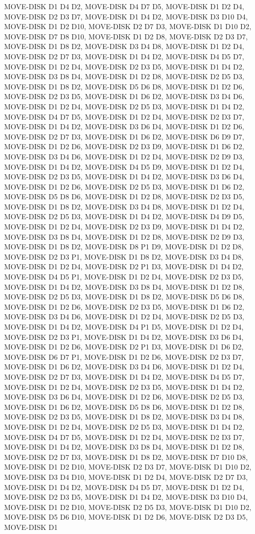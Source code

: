 \documentclass[12pt]{article}
\begin{document}
\begin{appendix}
\begin{itemize}
MOVE-DISK D1 D4 D2,  MOVE-DISK D4 D7 D5,  MOVE-DISK D1 D2 D4,  MOVE-DISK D2 D3 D7,  MOVE-DISK D1 D4 D2,  MOVE-DISK D3 D10 D4,  MOVE-DISK D1 D2 D10,  MOVE-DISK D2 D7 D3,  MOVE-DISK D1 D10 D2,  MOVE-DISK D7 D8 D10,  MOVE-DISK D1 D2 D8,  MOVE-DISK D2 D3 D7,  MOVE-DISK D1 D8 D2,  MOVE-DISK D3 D4 D8,  MOVE-DISK D1 D2 D4,  MOVE-DISK D2 D7 D3,  MOVE-DISK D1 D4 D2,  MOVE-DISK D4 D5 D7,  MOVE-DISK D1 D2 D4,  MOVE-DISK D2 D3 D5,  MOVE-DISK D1 D4 D2,  MOVE-DISK D3 D8 D4,  MOVE-DISK D1 D2 D8,  MOVE-DISK D2 D5 D3,  MOVE-DISK D1 D8 D2,  MOVE-DISK D5 D6 D8,  MOVE-DISK D1 D2 D6,  MOVE-DISK D2 D3 D5,  MOVE-DISK D1 D6 D2,  MOVE-DISK D3 D4 D6,  MOVE-DISK D1 D2 D4,  MOVE-DISK D2 D5 D3,  MOVE-DISK D1 D4 D2,  MOVE-DISK D4 D7 D5,  MOVE-DISK D1 D2 D4,  MOVE-DISK D2 D3 D7,  MOVE-DISK D1 D4 D2,  MOVE-DISK D3 D6 D4,  MOVE-DISK D1 D2 D6,  MOVE-DISK D2 D7 D3,  MOVE-DISK D1 D6 D2,  MOVE-DISK D6 D9 D7,  MOVE-DISK D1 D2 D6,  MOVE-DISK D2 D3 D9,  MOVE-DISK D1 D6 D2,  MOVE-DISK D3 D4 D6,  MOVE-DISK D1 D2 D4,  MOVE-DISK D2 D9 D3,  MOVE-DISK D1 D4 D2,  MOVE-DISK D4 D5 D9,  MOVE-DISK D1 D2 D4,  MOVE-DISK D2 D3 D5,  MOVE-DISK D1 D4 D2,  MOVE-DISK D3 D6 D4,  MOVE-DISK D1 D2 D6,  MOVE-DISK D2 D5 D3,  MOVE-DISK D1 D6 D2,  MOVE-DISK D5 D8 D6,  MOVE-DISK D1 D2 D8,  MOVE-DISK D2 D3 D5,  MOVE-DISK D1 D8 D2,  MOVE-DISK D3 D4 D8,  MOVE-DISK D1 D2 D4,  MOVE-DISK D2 D5 D3,  MOVE-DISK D1 D4 D2,  MOVE-DISK D4 D9 D5,  MOVE-DISK D1 D2 D4,  MOVE-DISK D2 D3 D9,  MOVE-DISK D1 D4 D2,  MOVE-DISK D3 D8 D4,  MOVE-DISK D1 D2 D8,  MOVE-DISK D2 D9 D3,  MOVE-DISK D1 D8 D2,  MOVE-DISK D8 P1 D9,  MOVE-DISK D1 D2 D8,  MOVE-DISK D2 D3 P1,  MOVE-DISK D1 D8 D2,  MOVE-DISK D3 D4 D8,  MOVE-DISK D1 D2 D4,  MOVE-DISK D2 P1 D3,  MOVE-DISK D1 D4 D2,  MOVE-DISK D4 D5 P1,  MOVE-DISK D1 D2 D4,  MOVE-DISK D2 D3 D5,  MOVE-DISK D1 D4 D2,  MOVE-DISK D3 D8 D4,  MOVE-DISK D1 D2 D8,  MOVE-DISK D2 D5 D3,  MOVE-DISK D1 D8 D2,  MOVE-DISK D5 D6 D8,  MOVE-DISK D1 D2 D6,  MOVE-DISK D2 D3 D5,  MOVE-DISK D1 D6 D2,  MOVE-DISK D3 D4 D6,  MOVE-DISK D1 D2 D4,  MOVE-DISK D2 D5 D3,  MOVE-DISK D1 D4 D2,  MOVE-DISK D4 P1 D5,  MOVE-DISK D1 D2 D4,  MOVE-DISK D2 D3 P1,  MOVE-DISK D1 D4 D2,  MOVE-DISK D3 D6 D4,  MOVE-DISK D1 D2 D6,  MOVE-DISK D2 P1 D3,  MOVE-DISK D1 D6 D2,  MOVE-DISK D6 D7 P1,  MOVE-DISK D1 D2 D6,  MOVE-DISK D2 D3 D7,  MOVE-DISK D1 D6 D2,  MOVE-DISK D3 D4 D6,  MOVE-DISK D1 D2 D4,  MOVE-DISK D2 D7 D3,  MOVE-DISK D1 D4 D2,  MOVE-DISK D4 D5 D7,  MOVE-DISK D1 D2 D4,  MOVE-DISK D2 D3 D5,  MOVE-DISK D1 D4 D2,  MOVE-DISK D3 D6 D4,  MOVE-DISK D1 D2 D6,  MOVE-DISK D2 D5 D3,  MOVE-DISK D1 D6 D2,  MOVE-DISK D5 D8 D6,  MOVE-DISK D1 D2 D8,  MOVE-DISK D2 D3 D5,  MOVE-DISK D1 D8 D2,  MOVE-DISK D3 D4 D8,  MOVE-DISK D1 D2 D4,  MOVE-DISK D2 D5 D3,  MOVE-DISK D1 D4 D2,  MOVE-DISK D4 D7 D5,  MOVE-DISK D1 D2 D4,  MOVE-DISK D2 D3 D7,  MOVE-DISK D1 D4 D2,  MOVE-DISK D3 D8 D4,  MOVE-DISK D1 D2 D8,  MOVE-DISK D2 D7 D3,  MOVE-DISK D1 D8 D2,  MOVE-DISK D7 D10 D8,  MOVE-DISK D1 D2 D10,  MOVE-DISK D2 D3 D7,  MOVE-DISK D1 D10 D2,  MOVE-DISK D3 D4 D10,  MOVE-DISK D1 D2 D4,  MOVE-DISK D2 D7 D3,  MOVE-DISK D1 D4 D2,  MOVE-DISK D4 D5 D7,  MOVE-DISK D1 D2 D4,  MOVE-DISK D2 D3 D5,  MOVE-DISK D1 D4 D2,  MOVE-DISK D3 D10 D4,  MOVE-DISK D1 D2 D10,  MOVE-DISK D2 D5 D3,  MOVE-DISK D1 D10 D2,  MOVE-DISK D5 D6 D10,  MOVE-DISK D1 D2 D6,  MOVE-DISK D2 D3 D5,  MOVE-DISK D1 
\end{itemize}
\end{appendix}
\end{document}
